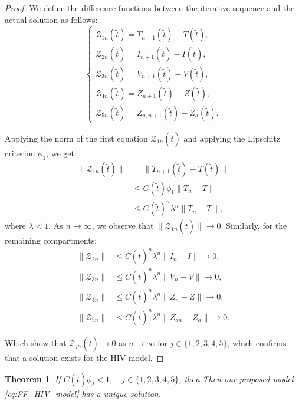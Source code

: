 \documentclass[10pt,a4paper]{amsart}
\newtheorem{theorem}{Theorem}[section]
\numberwithin{equation}{section}
\begin{document}
\begin{proof}
	We define the difference functions between the iterative sequence and the actual solution as follows:
	\begin{equation*}
		\begin{cases}
			\mathcal{Z}_{1n}(\tilde{t}) = T_{n+1}(\tilde{t}) - T(\tilde{t}), \\
			\mathcal{Z}_{2n}(\tilde{t}) = I_{n+1}(\tilde{t}) - I(\tilde{t}), \\
			\mathcal{Z}_{3n}(\tilde{t}) = V_{n+1}(\tilde{t}) - V(\tilde{t}), \\
			\mathcal{Z}_{4n}(\tilde{t}) = Z_{n+1}(\tilde{t}) - Z(\tilde{t}), \\
			\mathcal{Z}_{5n}(\tilde{t}) = Z_{a,n+1}(\tilde{t}) - Z_{a}(\tilde{t}).
		\end{cases}
	\end{equation*}
	
	Applying the norm of the first equation $\mathcal{Z}_{1n}(\tilde{t})$ and applying the Lipschitz criterion $\phi_1$, we get:
	\begin{align*}
		\|\mathcal{Z}_{1n}(\tilde{t})\| &= \|T_{n+1}(\tilde{t}) - T(\tilde{t})\| \\
		&\leq C(\tilde{t}) \phi_1 \|T_n - T\| \\
		&\leq C(\tilde{t})^n \lambda^n \|T_n - T\|,
	\end{align*}
	where $\lambda < 1$. As $n \to \infty$, we observe that $\|\mathcal{Z}_{1n}(\tilde{t})\| \to 0$. Similarly, for the remaining compartments:
	\begin{align*}
		\|\mathcal{Z}_{2n}\| &\leq C(\tilde{t})^n \lambda^n \|I_n - I\| \to 0, \\
		\|\mathcal{Z}_{3n}\| &\leq C(\tilde{t})^n \lambda^n \|V_n - V\| \to 0, \\
		\|\mathcal{Z}_{4n}\| &\leq C(\tilde{t})^n \lambda^n \|Z_n - Z\| \to 0, \\
		\|\mathcal{Z}_{5n}\| &\leq C(\tilde{t})^n \lambda^n \|Z_{an} - Z_a\| \to 0.
	\end{align*}
	
	Which show that $\mathcal{Z}_{jn}(\tilde{t}) \to 0$ as $n \to \infty$ for $j \in \{1, 2, 3, 4, 5\}$, which confirms that a solution exists for the HIV model.
\end{proof}
\begin{theorem}
	If $C(\tilde{t}) \phi_j < 1, \quad j \in \{1, 2, 3, 4, 5\}$, then Then our proposed model \eqref{eq:FF_HIV_model} has a unique solution.
\end{theorem}
\end{document}
